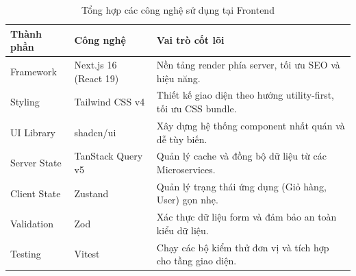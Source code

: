 \begin{table}[H]
    \centering
    \renewcommand{\arraystretch}{1.4}
    \caption{Tổng hợp các công nghệ sử dụng tại Frontend}
    \label{tab:frontend_summary}
    \begin{tabular}{|l|p{4.5cm}|p{6.5cm}|}
        \hline
        \textbf{Thành phần} & \textbf{Công nghệ}    & \textbf{Vai trò cốt lõi}                                        \\ \hline
        Framework           & Next.js 16 (React 19) & Nền tảng render phía server, tối ưu SEO và hiệu năng.           \\ \hline
        Styling             & Tailwind CSS v4       & Thiết kế giao diện theo hướng utility-first, tối ưu CSS bundle. \\ \hline
        UI Library          & shadcn/ui             & Xây dựng hệ thống component nhất quán và dễ tùy biến.           \\ \hline
        Server State        & TanStack Query v5     & Quản lý cache và đồng bộ dữ liệu từ các Microservices.          \\ \hline
        Client State        & Zustand               & Quản lý trạng thái ứng dụng (Giỏ hàng, User) gọn nhẹ.           \\ \hline
        Validation          & Zod                   & Xác thực dữ liệu form và đảm bảo an toàn kiểu dữ liệu.          \\ \hline
        Testing             & Vitest                & Chạy các bộ kiểm thử đơn vị và tích hợp cho tầng giao diện.     \\ \hline
    \end{tabular}
\end{table}
